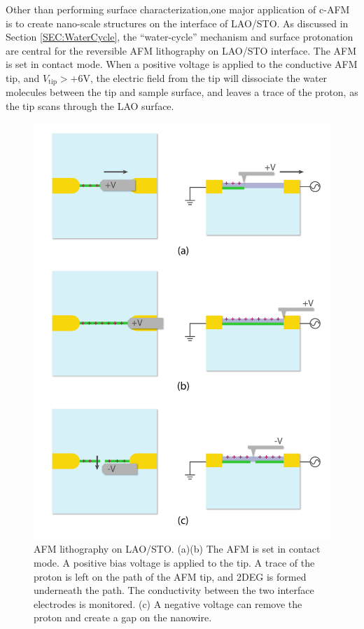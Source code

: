 \documentclass[pdflatex, sectionletters, 12pt]{pittetd}    %
\begin{document}
Other than performing surface characterization,one major application of c-AFM is to create nano-scale structures on the interface of LAO/STO. As discussed in Section \ref{SEC:WaterCycle}, the ``water-cycle'' mechanism\cite{bi2010water} and surface protonation\cite{brown2016giant} are central for the reversible AFM lithography on LAO/STO interface. The AFM is set in contact mode. When a positive voltage is applied to the conductive AFM tip, and $V_\mathrm{tip} > +6$V\cite{cen2008nanoscale}, the electric field from the tip will dissociate the water molecules between the tip and sample surface, and leaves a trace of the proton, as the tip scans through the LAO surface. 

\begin{figure}[p]
	\centering
	\includegraphics[width=.80\textwidth]{Drawing/Lithography.pdf}
	\caption{AFM lithography on LAO/STO. (a)(b) The AFM is set in contact mode. A positive bias voltage is applied to the tip. A trace of the proton is left on the path of the AFM tip, and 2DEG is formed underneath the path. The conductivity between the two interface electrodes is monitored. (c) A negative voltage can remove the proton and create a gap on the nanowire.}
	\label{FIG:Lithography}
\end{figure}
\end{document}
